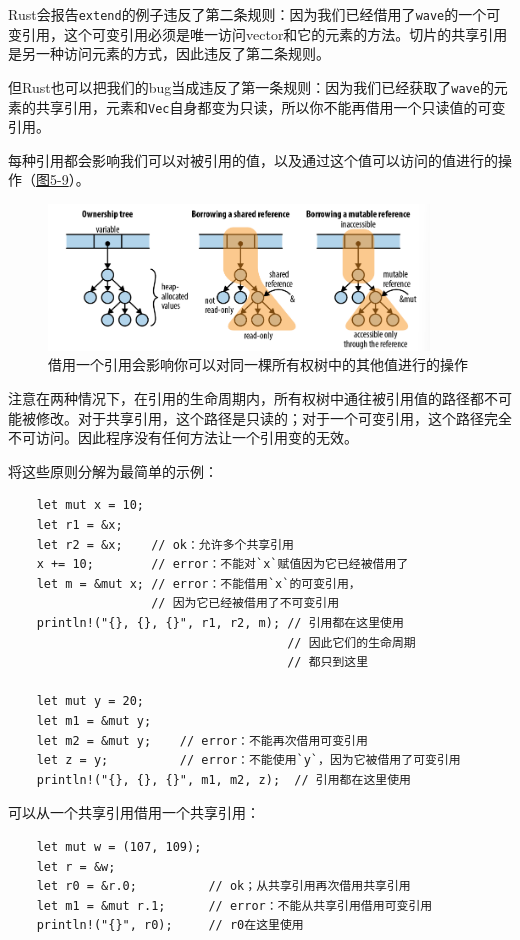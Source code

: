 Rust会报告\texttt{extend}的例子违反了第二条规则：因为我们已经借用了\texttt{wave}的一个可变引用，这个可变引用必须是唯一访问vector和它的元素的方法。切片的共享引用是另一种访问元素的方式，因此违反了第二条规则。

但Rust也可以把我们的bug当成违反了第一条规则：因为我们已经获取了\texttt{wave}的元素的共享引用，元素和\texttt{Vec}自身都变为只读，所以你不能再借用一个只读值的可变引用。

每种引用都会影响我们可以对被引用的值，以及通过这个值可以访问的值进行的操作（\hyperref[f5-9]{图5-9}）。

\begin{figure}[htbp]
    \centering
    \includegraphics[width=0.9\textwidth]{../img/f5-9.png}
    \caption{借用一个引用会影响你可以对同一棵所有权树中的其他值进行的操作}
    \label{f5-9}
\end{figure}

注意在两种情况下，在引用的生命周期内，所有权树中通往被引用值的路径都不可能被修改。对于共享引用，这个路径是只读的；对于一个可变引用，这个路径完全不可访问。因此程序没有任何方法让一个引用变的无效。

将这些原则分解为最简单的示例：
\begin{verbatim}
    let mut x = 10;
    let r1 = &x;
    let r2 = &x;    // ok：允许多个共享引用
    x += 10;        // error：不能对`x`赋值因为它已经被借用了
    let m = &mut x; // error：不能借用`x`的可变引用，
                    // 因为它已经被借用了不可变引用
    println!("{}, {}, {}", r1, r2, m); // 引用都在这里使用
                                       // 因此它们的生命周期
                                       // 都只到这里

    let mut y = 20;
    let m1 = &mut y;
    let m2 = &mut y;    // error：不能再次借用可变引用
    let z = y;          // error：不能使用`y`，因为它被借用了可变引用
    println!("{}, {}, {}", m1, m2, z);  // 引用都在这里使用
\end{verbatim}

可以从一个共享引用借用一个共享引用：
\begin{verbatim}
    let mut w = (107, 109);
    let r = &w;
    let r0 = &r.0;          // ok；从共享引用再次借用共享引用
    let m1 = &mut r.1;      // error：不能从共享引用借用可变引用
    println!("{}", r0);     // r0在这里使用
\end{verbatim}

